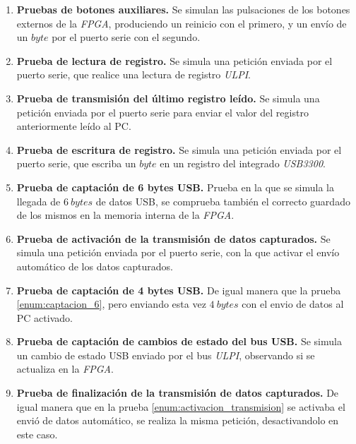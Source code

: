 \begin{enumerate}
    \item \textbf{Pruebas de botones auxiliares.}
    Se simulan las pulsaciones de los botones externos de la \emph{FPGA}, produciendo un reinicio con el primero, y un envío de un $byte$ por el puerto serie con el segundo.

    \item \textbf{Prueba de lectura de registro.}
    Se simula una petición enviada por el puerto serie, que realice una lectura de registro \emph{ULPI}.
    
    \item \textbf{Prueba de transmisión del último registro leído.}
    Se simula una petición enviada por el puerto serie para enviar el valor del registro anteriormente leído al PC.
    
    \item \textbf{Prueba de escritura de registro.}
    Se simula una petición enviada por el puerto serie, que escriba un $byte$ en un registro del integrado \emph{USB3300}.
    
    \item \textbf{Prueba de captación de 6 bytes USB.}{\label{enum:captacion_6}}
    Prueba en la que se simula la llegada de $6~bytes$ de datos USB, se comprueba también el correcto guardado de los mismos en la memoria interna de la \emph{FPGA}.
    
    \item \textbf{Prueba de activación de la transmisión de datos capturados.}{\label{enum:activacion_transmision}}
    Se simula una petición enviada por el puerto serie, con la que activar el envío automático de los datos capturados.
    
    \item \textbf{Prueba de captación de 4 bytes USB.}
    De igual manera que la prueba \ref{enum:captacion_6}, pero enviando esta vez $4~bytes$ con el envio de datos al PC activado.
    
    \item \textbf{Prueba de captación de cambios de estado del bus USB.}
    Se simula un cambio de estado USB enviado por el bus \emph{ULPI}, observando si se actualiza en la \emph{FPGA}.
    
    \item \textbf{Prueba de finalización de la transmisión de datos capturados.}
    De igual manera que en la prueba \ref{enum:activacion_transmision} se activaba el envió de datos automático, se realiza la misma petición, desactivandolo en este caso.
\end{enumerate}


